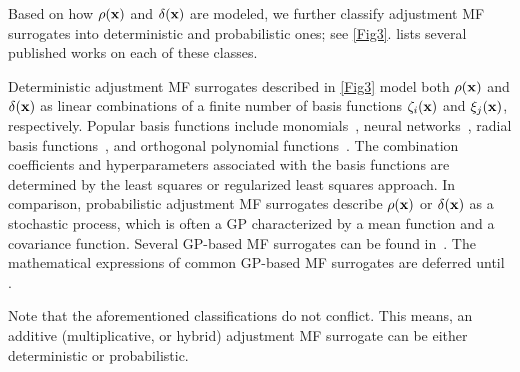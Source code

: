 \documentclass[iicol,sn-basic]{sn-jnl}%
\begin{document}
Based on how $\rho({\bf {x}})$ and $\delta({\bf{x}})$ are modeled, we further classify adjustment MF surrogates into deterministic and probabilistic ones; see \cref{Fig3}.
 lists several published works on each of these classes.

Deterministic adjustment MF surrogates described in \cref{Fig3} model both $\rho({\bf {x}})$ and $\delta({\bf{x}})$ as linear combinations of a finite number of basis functions $\zeta_i({\bf {x}})$ and $\xi_j({\bf x})$, respectively.
Popular basis functions include monomials~\citep{ZhangYiming2018,FernandezGodino2019}, neural networks~\citep{Kou2019}, radial basis functions~\citep{Tyan2015,LiuB2016,Durantin2017}, and orthogonal polynomial functions~\citep{Palar2016}. 
The combination coefficients and hyperparameters associated with the basis functions are determined by the least squares or regularized least squares approach. 
In comparison, probabilistic adjustment MF surrogates describe $\rho({\bf {x}})$ or $\delta({\bf{x}})$ as a stochastic process, which is often a GP characterized by a mean function and a covariance function.   
Several GP-based MF surrogates can be found in~\cite{Brevault2020}.
The mathematical expressions of common GP-based MF surrogates are deferred until .  

Note that the aforementioned classifications do not conflict.
This means, an additive (multiplicative, or hybrid) adjustment MF surrogate can be either deterministic or probabilistic.
\end{document}
